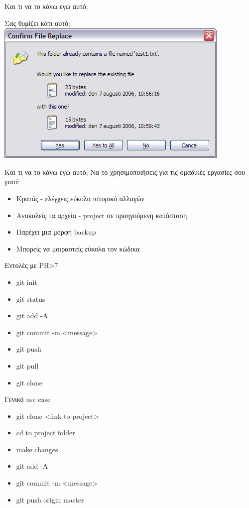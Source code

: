 \documentclass{beamer}
\begin{document}
\begin{frame}{Και τι να το κάνω εγώ αυτό;}
 \begin{center}
    Σας θυμίζει κάτι αυτό;\\
    \includegraphics[scale=0.45]{replace.png}
  \end{center}
\end{frame}

\begin{frame}{Και τι να το κάνω εγώ αυτό;}
 Να το χρησιμοποιήσεις για τις ομαδικές εργασίες σου γιατί: 
  \begin{itemize}
    \item Κρατάς - ελέγχεις εύκολα ιστορικό αλλαγών
    \pause
    \item Ανακαλείς τα αρχεία - project σε προηγούμενη κατάσταση
    \pause
    \item Παρέχει μια μορφή backup
    \pause
    \item Μπορείς να μοιραστείς εύκολα τον κώδικα
  \end{itemize}
\end{frame}

\begin{frame}{Εντολές με PH>7}
\begin{itemize}
 \item git init
 \item git status
 \item git add -A
 \item git commit -m <message>
 \item git push
 \item git pull
 \item git clone
\end{itemize}
\end{frame}

\begin{frame}{Γενικό use case}
\begin{itemize}
  \item git clone <link to project>
  \item cd to project folder
  \item make changes
  \item git add -A
  \item git commit -m <message>
  \item git push origin master
\end{itemize}
\end{frame}
\end{document}
